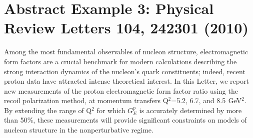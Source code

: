 \documentclass{article}
\begin{document}
\section{Abstract Example 3: Physical Review Letters 104, 242301 (2010)}
Among the most fundamental observables of nucleon structure, electromagnetic form factors are a crucial benchmark for modern calculations describing the strong interaction dynamics of the nucleon's quark constituents; indeed, recent proton data have attracted intense theoretical interest. In this Letter, we report new measurements of the proton electromagnetic form factor ratio using the recoil polarization method, at momentum transfers Q$^2$=5.2, 6.7, and 8.5  GeV$^2$. By extending the range of Q$^2$ for which $G_E^p$ is accurately determined by more than 50\%, these measurements will provide significant constraints on models of nucleon structure in the nonperturbative regime.
\end{document}
